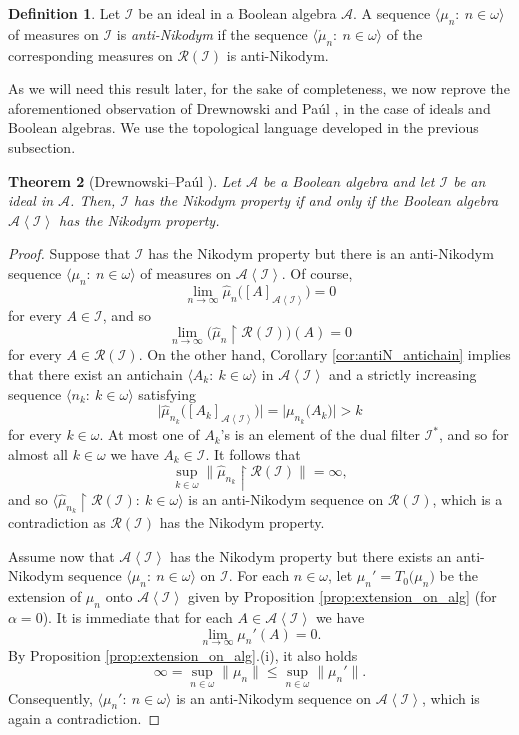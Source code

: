 \documentclass[a4paper,11pt,fleqn]{amsart}
\newtheorem{theorem}{Theorem}[section]
\theoremstyle{definition}
\newtheorem{definition}[theorem]{Definition}
\theoremstyle{remark}
\numberwithin{equation}{section}
\newcommand{\N}{\mathbb{N}}
\newcommand{\aA}{\mathcal{A}}
\newcommand{\iI}{\mathcal{I}}
\newcommand{\rR}{\mathcal{R}}
\newcommand{\rstr}{\restriction}
\newcommand{\wh}{\widehat}
\newcommand{\seqn}[1]{\big\langle#1\colon\ n\io\big\rangle}
\newcommand{\seqk}[1]{\big\langle#1\colon\ k\io\big\rangle}
\newcommand{\gen}[1]{\mathopen{}\left\langle#1\mathclose{}\right\rangle}
\newcommand{\clopen}[1]{\left[#1\right]}
\newcommand{\io}{\in\omega}%
\begin{document}
\begin{definition}\label{def:anti_nik_ideal}
    Let $\iI$ be an ideal in a Boolean algebra $\aA$. A sequence $\seqn{\mu_n}$ of measures on $\iI$ is \textit{anti-Nikodym} if the sequence $\seqn{\mathring{\mu}_n}$ of the corresponding measures on $\rR(\iI)$ is anti-Nikodym.
\end{definition}

As we will need this result later, for the sake of completeness, we now reprove the aforementioned observation of Drewnowski and Pa\'{u}l \cite[Remark 2.2.(a)]{DP00}, in the case of ideals and Boolean algebras. We use the topological language developed in the previous subsection.%

\begin{theorem}[{Drewnowski--Pa\'{u}l \cite{DP00}}]\label{thm:nik_prop_ideal_algebra}
Let $\aA$ be a Boolean algebra and let $\iI$ be an ideal in $\aA$. Then, $\iI$ has the Nikodym property if and only if the Boolean algebra $\aA\gen{\iI}$ has the Nikodym property.
\end{theorem}
\begin{proof}
Suppose that $\iI$ has the Nikodym property but there is an anti-Nikodym sequence $\seqn{\mu_n}$ of measures on $\aA\gen{\iI}$. Of course, 
\[\lim_{n\to\infty}\wh{\mu}_n\big(\clopen{A}_{\aA\gen{\iI}}\big)=0\]
for every $A\in\iI$, and so
\[\lim_{n\to\infty}\big(\wh{\mu}_n\rstr\rR(\iI)\big)(A)=0\]
for every $A\in\rR(\iI)$. On the other hand, Corollary \ref{cor:antiN_antichain} implies that there exist an antichain $\seqk{A_k}$ in $\aA\gen{\iI}$ and a strictly increasing sequence $\seqk{n_k}$ satisfying
\[\big|\wh{\mu}_{n_k}\big(\clopen{A_k}_{\aA\gen{\iI}}\big)\big|=\big|\mu_{n_k}\big(A_k\big)\big|>k\] for every $k\io$. At most one of $A_k$'s is an element of the dual filter $\iI^*$, and so for almost all $k\io$ we have $A_k\in\iI$. It follows that
\[\sup_{k\io}\big\|\wh{\mu}_{n_k}\rstr\rR(\iI)\big\|=\infty,\]
and so $\seqk{\wh{\mu}_{n_k}\rstr\rR(\iI)}$ is an anti-Nikodym sequence on $\rR(\iI)$, which is a contradiction as $\rR(\iI)$ has the Nikodym property.

Assume now that $\aA\gen{\iI}$ has the Nikodym property but there exists an anti-Nikodym sequence $\seqn{\mu_n}$ on $\iI$. For each $n\io$, let $\mu_n'=T_0\big(\mu_n\big)$ be the extension of $\mu_n$ onto $\aA\gen{\iI}$ given by Proposition \ref{prop:extension_on_alg} (for $\alpha=0$). It is immediate that for each $A\in\aA\gen{\iI}$ we have
\[\lim_{n\to\infty}\mu_n'(A)=0.\]
By Proposition \ref{prop:extension_on_alg}.(i), it also holds
\[\infty=\sup_{n\io}\big\|\mu_n\big\|\le\sup_{n\io}\big\|\mu_n'\big\|.\]
Consequently, $\seqn{\mu_n'}$ is an anti-Nikodym sequence on $\aA\gen{\iI}$, which is again a contradiction.
\end{proof}
\end{document}
